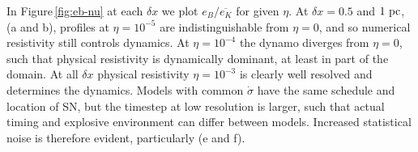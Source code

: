 \documentclass[preprint2]{aastex63}
\newcommand\Rm{{\rm Rm} }
\newcommand\pc{~ {\rm pc}}
\newcommand\dx{ {\delta x}}
\begin{document}
 In Figure\,\ref{fig:eb-nu} at each $\dx$ we plot $e_B/\overline{e_K}$
 for given $\eta$.
 At $\dx=0.5$ and $1\pc$, (a and b), profiles at $\eta=10^{-5}$ are
 indistinguishable from $\eta=0$, and so numerical resistivity still
 controls dynamics.
 At $\eta=10^{-4}$ the dynamo diverges from $\eta=0$, such that physical
 resistivity is dynamically dominant, at least in part of the domain.
 At all $\dx$ physical resistivity $\eta=10^{-3}$ is clearly well resolved
 and determines the dynamics.
 Models with common $\dot\sigma$ have the same schedule and location of SN,
 but the timestep at low resolution is larger, such that actual timing and
 explosive environment can differ between models.
 Increased statistical noise is therefore evident, particularly (e and f).


\end{document}
